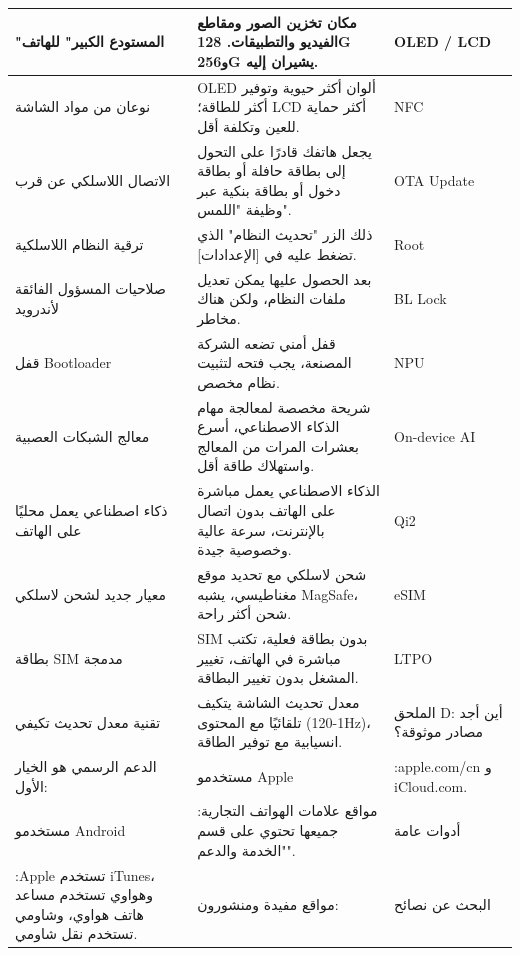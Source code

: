 
\begin{center}
\begin{tabularx}{\linewidth}{|X|X|X|}
\hline
\textbf{"المستودع الكبير" للهاتف} & \textbf{مكان تخزين الصور ومقاطع الفيديو والتطبيقات. 128G و256G يشيران إليه.} & \textbf{OLED / LCD} \tabularnewline
\hline
نوعان من مواد الشاشة & OLED ألوان أكثر حيوية وتوفير أكثر للطاقة؛ LCD أكثر حماية للعين وتكلفة أقل. & NFC \tabularnewline
الاتصال اللاسلكي عن قرب & يجعل هاتفك قادرًا على التحول إلى بطاقة حافلة أو بطاقة دخول أو بطاقة بنكية عبر وظيفة "اللمس". & OTA Update \tabularnewline
ترقية النظام اللاسلكية & ذلك الزر "تحديث النظام" الذي تضغط عليه في [الإعدادات]. & Root \tabularnewline
صلاحيات المسؤول الفائقة لأندرويد & بعد الحصول عليها يمكن تعديل ملفات النظام، ولكن هناك مخاطر. & BL Lock \tabularnewline
قفل Bootloader & قفل أمني تضعه الشركة المصنعة، يجب فتحه لتثبيت نظام مخصص. & NPU \tabularnewline
معالج الشبكات العصبية & شريحة مخصصة لمعالجة مهام الذكاء الاصطناعي، أسرع بعشرات المرات من المعالج واستهلاك طاقة أقل. & On-device AI \tabularnewline
ذكاء اصطناعي يعمل محليًا على الهاتف & الذكاء الاصطناعي يعمل مباشرة على الهاتف بدون اتصال بالإنترنت، سرعة عالية وخصوصية جيدة. & Qi2 \tabularnewline
معيار جديد لشحن لاسلكي & شحن لاسلكي مع تحديد موقع مغناطيسي، يشبه MagSafe، شحن أكثر راحة. & eSIM \tabularnewline
بطاقة SIM مدمجة & SIM بدون بطاقة فعلية، تكتب مباشرة في الهاتف، تغيير المشغل بدون تغيير البطاقة. & LTPO \tabularnewline
تقنية معدل تحديث تكيفي & معدل تحديث الشاشة يتكيف تلقائيًا مع المحتوى (1-120Hz)، انسيابية مع توفير الطاقة. & الملحق D: أين أجد مصادر موثوقة؟ \tabularnewline
الدعم الرسمي هو الخيار الأول: & مستخدمو Apple & :apple.com/cn و iCloud.com. \tabularnewline
مستخدمو Android & :مواقع علامات الهواتف التجارية جميعها تحتوي على قسم "الخدمة والدعم". & أدوات عامة \tabularnewline
:Apple تستخدم iTunes، وهواوي تستخدم مساعد هاتف هواوي، وشاومي تستخدم نقل شاومي. & مواقع مفيدة ومنشورون: & البحث عن نصائح \tabularnewline
\hline
\end{tabularx}
\end{center}

